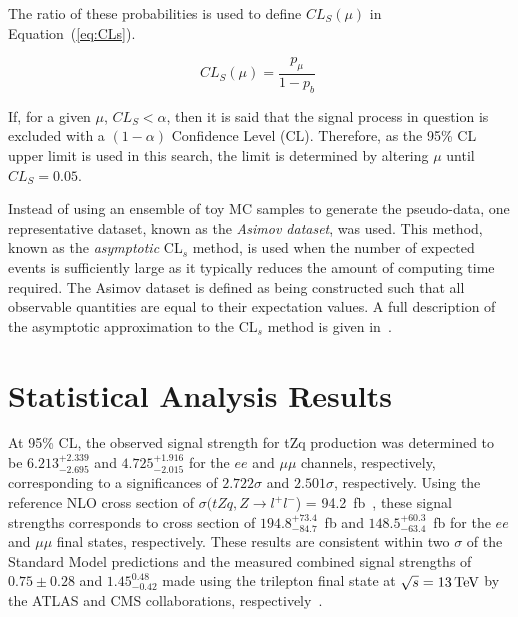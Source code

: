 The ratio of these probabilities is used to define $CL_{S} (\mu)$ in Equation~(\ref{eq:CLs}).

\begin{equation}
CL_{S} (\mu) = \frac{ p_{\mu} }{ 1 - p_{b} }\;
\label{eq:CLs}
\end{equation}

If, for a given $\mu$, $CL_{S} < \alpha$, then it is said that the signal process in question is excluded with a $(1 - \alpha)$ Confidence Level (CL).
Therefore, as the 95\% CL upper limit is used in this search, the limit is determined by altering $\mu$  until $CL_{S} = 0.05$.

Instead of using an ensemble of toy MC samples to generate the pseudo-data, one representative dataset, known as the \emph{Asimov dataset}, was used.
This method, known as the \emph{asymptotic} CL$_{s}$ method, is used when the number of expected events is sufficiently large as it typically reduces the amount of computing time required.
The Asimov dataset is defined as being constructed such that all observable quantities are equal to their expectation values.
A full description of the asymptotic approximation to the CL$_{s}$ method is given in~\cite{AsymptoticFormulae}.

\section{Statistical Analysis Results}\label{sec:results}
At 95\% CL, the observed signal strength for tZq production was determined to be $6.213_{-2.695}^{+2.339}$ and $4.725_{-2.015}^{+1.916}$ for the $ee$ and $\mu\mu$ channels, respectively, corresponding to a significances of $2.722 \sigma$ and $2.501\sigma$, respectively. %
Using the reference NLO cross section of $\sigma (tZq, Z \rightarrow l^{+} l^{-}$) = 94.2~fb~\cite{Campbell:2013yla}, these signal strengths corresponds to cross section of $194.8_{-84.7}^{+73.4}$~fb and $148.5_{-63.4}^{+60.3}$~fb for the $ee$ and $\mu\mu$ final states, respectively. %
These results are consistent within two $\sigma$ of the Standard Model predictions and the measured combined signal strengths of $0.75 \pm 0.28$ and $1.45^{0.48}_{-0.42}$ made using the trilepton final state at $\sqrt{s} = 13 \,\text{Te\hspace{-.08em}V}$ by the ATLAS and CMS collaborations, respectively~\cite{Aaboud:2017ylb,Sirunyan:2017nbr}.

